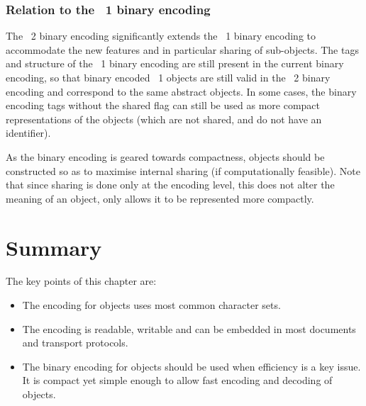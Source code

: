 \subsubsection{Relation to the \OM~1 binary encoding}\label{sec_relation_OM1_binary}

The \OM~2 binary encoding significantly extends the \OM~1 binary encoding to accommodate
the new features and in particular sharing of sub-objects. The tags and structure of the
\OM~1 binary encoding are still present in the current \OM binary encoding, so that binary
encoded \OM~1 objects are still valid in the \OM~2 binary encoding and correspond to the
same abstract \OM objects. In some cases, the binary encoding tags without the shared flag
can still be used as more compact representations of the objects (which are not shared,
and do not have an identifier).
  

As the binary encoding is geared towards compactness, \OM objects should be constructed so
as to maximise internal sharing (if computationally feasible). Note that since sharing is
done only at the encoding level, this does not alter the meaning of an \OM object, only
allows it to be represented more compactly.
  
\section{Summary}\label{sec_enc_summary}
  
The key points of this chapter are:
\begin{itemize}
\item The \XML encoding for \OM objects uses most common character sets.
\item The \XML encoding is readable, writable and can be embedded in most documents and
  transport protocols.
\item The binary encoding for \OM objects should be used when efficiency is a key
  issue. It is compact yet simple enough to allow fast encoding and decoding of objects.
\end{itemize}
  


